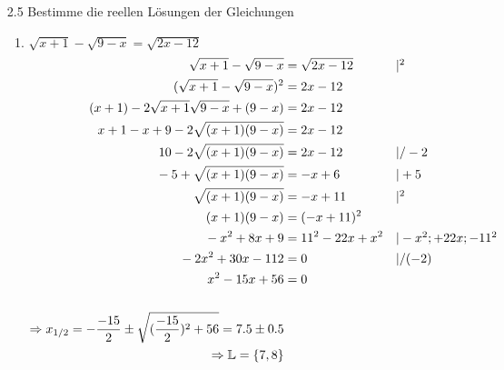 \documentclass[12pt,letterpaper]{article}
\newcommand{\alignleft}[1]{\tag*{\llap{\makebox[\linewidth][l]{$#1$}}}}
\newcommand{\LLeftrightarrow}{ \alignleft{\Leftrightarrow}}
\newcommand{\eqinfo}[1]{&\makebox[2cm][l]{$\vert #1$}}
\newcommand{\Eqn}[3]{#1 &#2 #3}
\newcommand{\eqn}[2]{\LLeftrightarrow\Eqn{#1}{=}{#2}\\}
\newcommand{\eqni}[3]{\LLeftrightarrow\Eqn{#1}{=}{#2}\eqinfo{#3}\\}
\newcommand{\eqnfi}[3]{\Eqn{#1}{=}{#2}\eqinfo{#3}\\}
\begin{document}
\begin{enumerate}
\item [2.5] Bestimme die reellen Lösungen der Gleichungen
\begin{enumerate}
\item $\sqrt{x+1}-\sqrt{9-x}=\sqrt{2x-12}$\\
\begin{align*}
\eqnfi{\sqrt{x+1}-\sqrt{9-x}}{\sqrt{2x-12}}{^2}
\eqn{(\sqrt{x+1}-\sqrt{9-x})^2}{2x-12}
\eqn{(x+1)-2\sqrt{x+1}\sqrt{9-x}+(9-x)}{2x-12}
\eqn{x+1-x+9-2\sqrt{(x+1)(9-x)}}{2x-12}
\eqni{10-2\sqrt{(x+1)(9-x)}}{2x-12}{/-2}
\eqni{-5+\sqrt{(x+1)(9-x)}}{-x+6}{+5}
\eqni{\sqrt{(x+1)(9-x)}}{-x+11}{^2}
\eqn{(x+1)(9-x)}{(-x+11)^2}
\eqni{-x^2+8x+9}{11^2-22x+x^2}{-x^2; +22x; -11^2}
\eqni{-2x^2+30x-112}{0}{/(-2)}
\eqn{x^2-15x+56}{0}
\\
\Rightarrow x_{1/2} = -\frac{-15}{2}\pm\sqrt{(\frac{-15}{2})^2+56}
= 7.5\pm 0.5\\
\Rightarrow \mathbb{L} = \{7,8\}
\end{align*}


\end{enumerate}
\end{enumerate}
\end{document}
